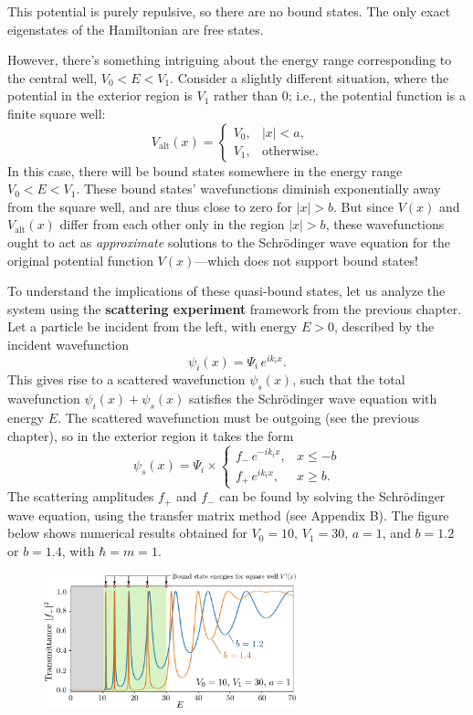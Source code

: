 \documentclass[pra,12pt]{revtex4}
\begin{document}
This potential is purely repulsive, so there are no bound states.  The
only exact eigenstates of the Hamiltonian are free states.

However, there's something intriguing about the energy range
corresponding to the central well, $V_0 < E < V_1$.  Consider a
slightly different situation, where the potential in the exterior
region is $V_1$ rather than $0$; i.e., the potential function is a
finite square well:
$$V_{\mathrm{alt}}(x) = \begin{cases}V_0, & |x| < a, \\ V_1, & \mathrm{otherwise}.\end{cases}$$
In this case, there will be bound states somewhere in the energy range
$V_0 < E < V_1$.  These bound states' wavefunctions diminish
exponentially away from the square well, and are thus close to zero
for $|x| > b$.  But since $V(x)$ and $V_{\mathrm{alt}}(x)$ differ from
each other only in the region $|x| > b$, these wavefunctions ought to
act as \textit{approximate} solutions to the Schr\"odinger wave
equation for the original potential function $V(x)$---which does not
support bound states!

To understand the implications of these quasi-bound states, let us
analyze the system using the \textbf{scattering experiment} framework
from the previous chapter.  Let a particle be incident from the left,
with energy $E > 0$, described by the incident wavefunction
$$\psi_i(x) = \Psi_i \, e^{ik_i x}.$$
This gives rise to a scattered wavefunction $\psi_s(x)$, such that the
total wavefunction $\psi_i(x) + \psi_s(x)$ satisfies the Schr\"odinger
wave equation with energy $E$.  The scattered wavefunction must be
outgoing (see the previous chapter), so in the exterior region it
takes the form
$$\psi_s(x) = \Psi_i \times \begin{cases}f_- \,e^{-ik_ix}, & x \le -b \\ f_+ \,e^{ik_ix}, & x \ge b.\end{cases}$$
The scattering amplitudes $f_+$ and $f_-$ can be found by solving the
Schr\"odinger wave equation, using the transfer matrix method (see
Appendix B).  The figure below shows numerical results obtained for
$V_0 = 10,\,V_1 = 30,\,a=1$, and $b = 1.2$ or $b = 1.4$, with $\hbar =
m = 1$.

\begin{figure}[h]
  \centering\includegraphics[width=0.65\textwidth]{resonances}
\end{figure}
\end{document}
